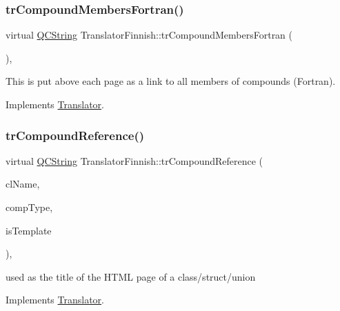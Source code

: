 \subsubsection{\texorpdfstring{trCompoundMembersFortran()}{trCompoundMembersFortran()}}
{\footnotesize\ttfamily virtual \mbox{\hyperlink{class_q_c_string}{Q\+C\+String}} Translator\+Finnish\+::tr\+Compound\+Members\+Fortran (\begin{DoxyParamCaption}{ }\end{DoxyParamCaption})\hspace{0.3cm}{\ttfamily [inline]}, {\ttfamily [virtual]}}

This is put above each page as a link to all members of compounds (Fortran). 

Implements \mbox{\hyperlink{class_translator}{Translator}}.

\mbox{\label{class_translator_finnish_a66d4788085a4d13978cf3ab424363565}} 
\subsubsection{\texorpdfstring{trCompoundReference()}{trCompoundReference()}}
{\footnotesize\ttfamily virtual \mbox{\hyperlink{class_q_c_string}{Q\+C\+String}} Translator\+Finnish\+::tr\+Compound\+Reference (\begin{DoxyParamCaption}\item[{const char $\ast$}]{cl\+Name,  }\item[{\mbox{\hyperlink{class_class_def_ae70cf86d35fe954a94c566fbcfc87939}{Class\+Def\+::\+Compound\+Type}}}]{comp\+Type,  }\item[{bool}]{is\+Template }\end{DoxyParamCaption})\hspace{0.3cm}{\ttfamily [inline]}, {\ttfamily [virtual]}}

used as the title of the H\+T\+ML page of a class/struct/union 

Implements \mbox{\hyperlink{class_translator}{Translator}}.

\mbox{\label{class_translator_finnish_a2878309ee9321f274f13580159ccec43}} 
